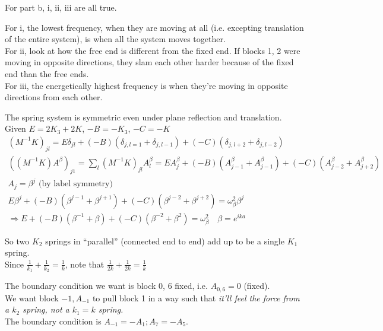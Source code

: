 \documentclass[twoside,10pt]{amsart}
\newcommand{\problemhead}[1]
  {\smallskip
   \noindent{\large\bf Problem #1.}
   \smallskip}
\begin{document}
For part b, i, ii, iii are all true.  

For i, the lowest frequency, when they are moving at all (i.e. excepting translation of the entire system), is when all the system moves together.  \\
For ii, look at how the free end is different from the fixed end.  If blocks 1, 2 were moving in opposite directions, they slam each other harder because of the fixed end than the free ends.  \\
For iii, the energetically highest frequency is when they're moving in opposite directions from each other.  

\problemhead{5.2} The spring system is symmetric even under plane reflection and translation.  \\
Given $E =2 K_3 + 2K$, $-B = -K_3$, $-C = -K$
\[
\begin{gathered}
  (M^{-1}K)_{jl} = E\delta_{jl} + (-B)(\delta_{j,l=1} + \delta_{j,l-1} ) + (-C) (\delta_{j,l+2} + \delta_{j,l-2} ) \\
  ((M^{-1}K)A^{\beta})_{j1} = \sum_l (M^{-1}K)_{jl} A_l^{\beta} = EA_j^{\beta} + (-B)(A_{j-1}^{\beta} + A_{j-1}^{\beta} ) + (-C) (A_{j-2}^{\beta} + A_{j+2}^{\beta} )   \\
  A_j = \beta^j \text{ (by label symmetry) } \\
  E\beta^j + (-B)(\beta^{j-1} + \beta^{j+1} ) + (-C) (\beta^{j-2} +\beta^{j+2} ) = \omega_{\beta}^2 \beta^j  \\
  \Longrightarrow E + (-B) (\beta^{-1} + \beta) + (-C)(\beta^{-2} + \beta^2 ) = \omega_{\beta}^2 \quad \beta = e^{ika}
\end{gathered}
\]

So two $K_2$ springs in ``parallel'' (connected end to end) add up to be a single $K_1$ spring.  \medskip \\
\quad Since $\frac{1}{k_1} + \frac{1}{k_2} = \frac{1}{k}$, note that $\frac{1}{2k} + \frac{1}{2k} = \frac{1}{k}$

The boundary condition we want is block 0, 6 fixed, i.e. $A_{0,6} = 0$ (fixed).  \\
We want block $-1,A_{-1}$ to pull block 1 in a way such that \emph{ it'll feel the force from a $k_2$ spring, not a $k_1 = k$ spring.}  \medskip \\
The boundary condition is $\boxed{ A_{-1} = -A_1; A_{7} = -A_5 }$.  
\end{document}
